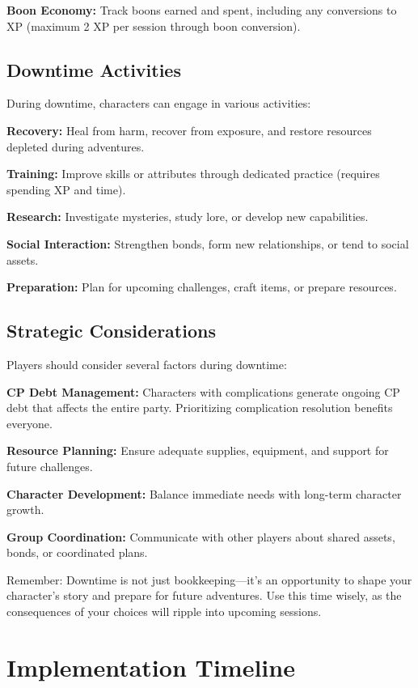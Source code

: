 \textbf{Boon Economy:} Track boons earned and spent, including any conversions to XP (maximum 2 XP per session through boon conversion).

\subsection{Downtime Activities}

During downtime, characters can engage in various activities:

\textbf{Recovery:} Heal from harm, recover from exposure, and restore resources depleted during adventures.

\textbf{Training:} Improve skills or attributes through dedicated practice (requires spending XP and time).

\textbf{Research:} Investigate mysteries, study lore, or develop new capabilities.

\textbf{Social Interaction:} Strengthen bonds, form new relationships, or tend to social assets.

\textbf{Preparation:} Plan for upcoming challenges, craft items, or prepare resources.

\subsection{Strategic Considerations}

Players should consider several factors during downtime:

\textbf{CP Debt Management:} Characters with complications generate ongoing CP debt that affects the entire party. Prioritizing complication resolution benefits everyone.

\textbf{Resource Planning:} Ensure adequate supplies, equipment, and support for future challenges.

\textbf{Character Development:} Balance immediate needs with long-term character growth.

\textbf{Group Coordination:} Communicate with other players about shared assets, bonds, or coordinated plans.

Remember: Downtime is not just bookkeeping—it's an opportunity to shape your character's story and prepare for future adventures. Use this time wisely, as the consequences of your choices will ripple into upcoming sessions.

\section{Implementation Timeline}

